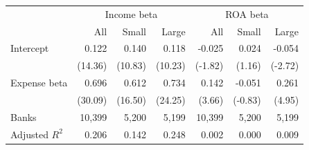 \begin{tabular}{lrrrrrr}
\toprule
 & \multicolumn{3}{c}{Income beta} & \multicolumn{3}{c}{ROA beta} \\
 & All & Small & Large & All & Small & Large \\
\midrule
Intercept & 0.122 & 0.140 & 0.118 & -0.025 & 0.024 & -0.054 \\
 & (14.36) & (10.83) & (10.23) & (-1.82) & (1.16) & (-2.72) \\
Expense beta & 0.696 & 0.612 & 0.734 & 0.142 & -0.051 & 0.261 \\
 & (30.09) & (16.50) & (24.25) & (3.66) & (-0.83) & (4.95) \\
Banks & 10,399 & 5,200 & 5,199 & 10,399 & 5,200 & 5,199 \\
Adjusted $R^2$ & 0.206 & 0.142 & 0.248 & 0.002 & 0.000 & 0.009 \\
\bottomrule
\end{tabular}
